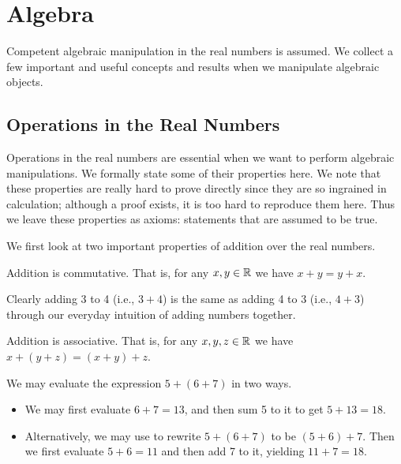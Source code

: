 \chapter{Algebra}
Competent algebraic manipulation in the real numbers is assumed. We collect a few important and useful concepts and results when we manipulate algebraic objects.

\section{Operations in the Real Numbers}
Operations in the real numbers are essential when we want to perform algebraic manipulations. We formally state some of their properties here. We note that these properties are really hard to prove directly since they are so ingrained in calculation; although a proof exists, it is too hard to reproduce them here. Thus we leave these properties as axioms: statements that are assumed to be true.

We first look at two important properties of addition over the real numbers.
\begin{axiom}\label{axiom-addition-is-commutative}
    Addition is commutative. That is, for any $x, y \in \mathbb{R}$ we have $x + y = y + x$.
\end{axiom}

\begin{example}
    Clearly adding 3 to 4 (i.e., $3 + 4$) is the same as adding 4 to 3 (i.e., $4 + 3$) through our everyday intuition of adding numbers together.
\end{example}

\begin{axiom}\label{axiom-addition-is-associative}
    Addition is associative. That is, for any $x, y, z \in \mathbb{R}$ we have $x+(y+z) = (x+y)+z$.
\end{axiom}

\begin{example}
    We may evaluate the expression $5+(6+7)$ in two ways.
    \begin{itemize}
        \item We may first evaluate $6+7 = 13$, and then sum 5 to it to get $5 + 13 = 18$.
        \item Alternatively, we may use  to rewrite $5+(6+7)$ to be $(5+6)+7$. Then we first evaluate $5+6 = 11$ and then add 7 to it, yielding $11 + 7 = 18$.
    \end{itemize}
\end{example}

